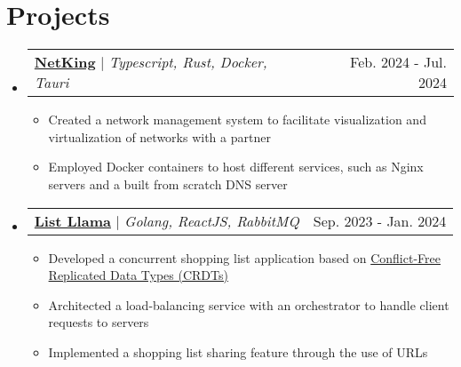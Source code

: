\documentclass[letterpaper,11pt]{article}
\makeatletter
\newcommand{\resumeItem}[1]{
  \item\small{
    {#1 \vspace{-2pt}}
  }
}
\newcommand{\resumeProjectHeading}[2]{
    \item
    \begin{tabular*}{0.97\textwidth}{l@{\extracolsep{\fill}}r}
      \small#1 & #2 \\
    \end{tabular*}\vspace{-7pt}
}
\newcommand{\resumeSubHeadingListStart}{\begin{itemize}[leftmargin=0.15in, label={}]}
\newcommand{\resumeSubHeadingListEnd}{\end{itemize}}
\newcommand{\resumeItemListStart}{\begin{itemize}}
\newcommand{\resumeItemListEnd}{\end{itemize}\vspace{-5pt}}
\makeatother
\begin{document}


\section{Projects}
\resumeSubHeadingListStart
      \resumeProjectHeading
          {\textbf{\href{https://github.com/matilde-silva-21/grs_project}{NetKing}} $|$ \emph{Typescript, Rust, Docker, Tauri}}{Feb. 2024 - Jul. 2024}
          \resumeItemListStart
            \resumeItem{Created a network management system to facilitate visualization and virtualization of networks with a partner}
            \resumeItem{Employed Docker containers to host different services, such as Nginx servers and a built from scratch DNS server}
          \resumeItemListEnd
      \resumeProjectHeading
          {\textbf{\href{https://ncgm.fe.up.pt/en/home}{List Llama}} $|$ \emph{Golang, ReactJS, RabbitMQ}}{Sep. 2023 - Jan. 2024}
          \resumeItemListStart
            \resumeItem{Developed a concurrent shopping list application based on \href{https://crdt.tech/}{Conflict-Free Replicated Data Types (CRDTs)}}
            \resumeItem{Architected a load-balancing service with an orchestrator to handle client requests to servers}
            \resumeItem{Implemented a shopping list sharing feature through the use of URLs}
          \resumeItemListEnd
    \resumeSubHeadingListEnd
\leavevmode \\ %
\end{document}

